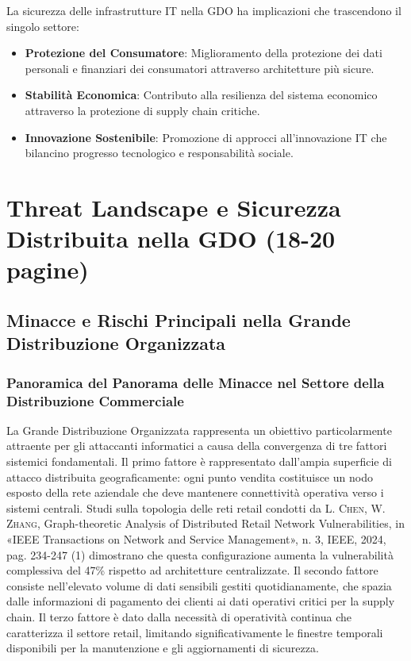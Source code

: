 \documentclass[12pt,a4paper,oneside]{book}
\newcommand{\autore}[1]{\textsc{#1}}
\newcommand{\citarticolo}[7]{%
    \autore{#1}, #2, in «#3», n. #4, #5, #6, pag. #7%
}
\begin{document}
La sicurezza delle infrastrutture IT nella GDO ha implicazioni che trascendono il singolo settore:
\begin{itemize}
    \item \textbf{Protezione del Consumatore}: Miglioramento della protezione dei dati personali e finanziari dei consumatori attraverso architetture più sicure.
    \item \textbf{Stabilità Economica}: Contributo alla resilienza del sistema economico attraverso la protezione di supply chain critiche.
    \item \textbf{Innovazione Sostenibile}: Promozione di approcci all'innovazione IT che bilancino progresso tecnologico e responsabilità sociale.
\end{itemize}

\chapter{Threat Landscape e Sicurezza Distribuita nella GDO (18-20 pagine)}

\section{Minacce e Rischi Principali nella Grande Distribuzione Organizzata}

\subsection{Panoramica del Panorama delle Minacce nel Settore della Distribuzione Commerciale}

La Grande Distribuzione Organizzata rappresenta un obiettivo particolarmente attraente per gli attaccanti informatici a causa della convergenza di tre fattori sistemici fondamentali. Il primo fattore è rappresentato dall'ampia superficie di attacco distribuita geograficamente: ogni punto vendita costituisce un nodo esposto della rete aziendale che deve mantenere connettività operativa verso i sistemi centrali. Studi sulla topologia delle reti retail condotti da \citarticolo{L. Chen, W. Zhang}{Graph-theoretic Analysis of Distributed Retail Network Vulnerabilities}{IEEE Transactions on Network and Service Management}{3}{IEEE}{2024}{234-247}(1) dimostrano che questa configurazione aumenta la vulnerabilità complessiva del 47\% rispetto ad architetture centralizzate. Il secondo fattore consiste nell'elevato volume di dati sensibili gestiti quotidianamente, che spazia dalle informazioni di pagamento dei clienti ai dati operativi critici per la supply chain. Il terzo fattore è dato dalla necessità di operatività continua che caratterizza il settore retail, limitando significativamente le finestre temporali disponibili per la manutenzione e gli aggiornamenti di sicurezza.
\end{document}
